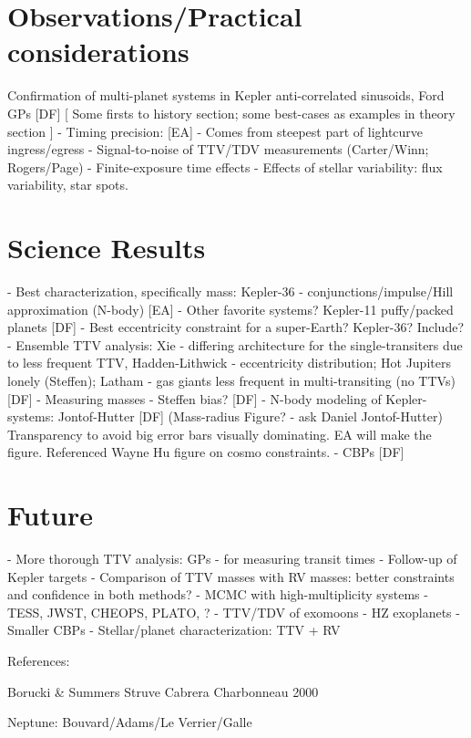 \documentclass[graybox,natbib,nosecnum]{svmult}
\begin{document}
\section{Observations/Practical considerations} %
Confirmation of multi-planet systems in Kepler anti-correlated sinusoids, Ford GPs [DF]
  [ Some firsts to history section; some best-cases as examples in theory section ]
  - Timing precision: [EA]
     - Comes from steepest part of lightcurve ingress/egress
     - Signal-to-noise of TTV/TDV measurements (Carter/Winn; Rogers/Page)
     - Finite-exposure time effects
     - Effects of stellar variability: flux variability, star spots.

\section{Science Results}
    - Best characterization, specifically mass: Kepler-36 - conjunctions/impulse/Hill approximation (N-body) [EA]
    - Other favorite systems? Kepler-11 puffy/packed planets  [DF]
    - Best eccentricity constraint for a super-Earth?  Kepler-36? Include? 
    - Ensemble TTV analysis: Xie - differing architecture for the single-transiters due to less frequent TTV, Hadden-Lithwick - eccentricity distribution; Hot Jupiters lonely (Steffen); Latham     - gas giants less frequent in multi-transiting (no TTVs)  [DF]
    - Measuring masses - Steffen bias?    [DF]
    - N-body modeling of Kepler-systems: Jontof-Hutter  [DF] (Mass-radius Figure? - ask Daniel Jontof-Hutter)  Transparency to avoid big error bars visually dominating.  EA will make the figure.  Referenced Wayne Hu figure on cosmo constraints.
    - CBPs   [DF]

\section{Future} %
  - More thorough TTV analysis: GPs - for measuring transit times
  - Follow-up of Kepler targets
  - Comparison of TTV masses with RV masses:  better constraints
    and confidence in both methods?
  - MCMC with high-multiplicity systems
  - TESS, JWST, CHEOPS, PLATO, ?
  - TTV/TDV of exomoons
  - HZ exoplanets
  - Smaller CBPs
  - Stellar/planet characterization: TTV + RV

References:

Borucki \& Summers
Struve
Cabrera
Charbonneau 2000

Neptune:
Bouvard/Adams/Le Verrier/Galle
\end{document}
